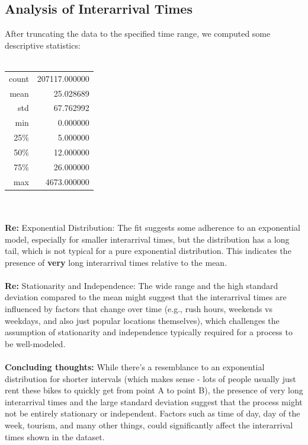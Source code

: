\documentclass{article}
\begin{document}
\subsection{Analysis of Interarrival Times}
After truncating the data to the specified time range, we computed some  descriptive statistics: \\\\
\begin{tabular}{rr}
    count & 207117.000000 \\
    mean & 25.028689 \\
    std & 67.762992 \\
    min & 0.000000 \\
    25\% & 5.000000 \\ 
    50\% & 12.000000 \\
    75\% & 26.000000 \\
    max & 4673.000000 \\
\end{tabular} \\\\
\textbf{Re:} Exponential Distribution: The fit suggests some adherence to an exponential model, especially for smaller interarrival times, but the distribution has a long tail, which is not typical for a pure exponential distribution. This indicates the presence of \textbf{very} long interarrival times relative to the mean. \\\\
\textbf{Re:} Stationarity and Independence: The wide range and the high standard deviation compared to the mean might suggest that the interarrival times are influenced by factors that change over time (e.g., rush hours, weekends vs weekdays, and also just popular locations themselves), which challenges the assumption of stationarity and independence typically required for a process to be well-modeled. \\\\
\textbf{Concluding thoughts:} While there's a resemblance to an exponential distribution for shorter intervals (which makes sense - lots of people usually just rent these bikes to quickly get from point A to point B), the presence of very long interarrival times and the large standard deviation suggest that the process might not be entirely stationary or independent. Factors such as time of day, day of the week, tourism, and many other things, could significantly affect the interarrival times shown in the dataset.
\end{document}
